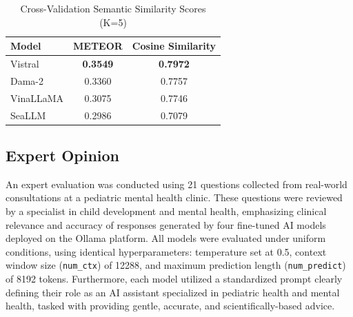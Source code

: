 \documentclass[runningheads]{llncs}
\begin{document}
\begin{table}[H]
\centering
\caption{Cross-Validation Semantic Similarity Scores (K=5)}
\label{tab:cv-semantic}
\begin{tabular}{|l|c|c|}
\hline
\textbf{Model} & \textbf{METEOR} & \textbf{Cosine Similarity} \\
\hline
Vistral    & \textbf{0.3549} & \textbf{0.7972} \\
Dama-2     & 0.3360 & 0.7757 \\
VinaLLaMA  & 0.3075 & 0.7746 \\
SeaLLM     & 0.2986 & 0.7079 \\
\hline
\end{tabular}
\end{table}

\subsection{Expert Opinion}

An expert evaluation was conducted using 21 questions collected from real-world consultations at a pediatric mental health clinic. These questions were reviewed by a specialist in child development and mental health, emphasizing clinical relevance and accuracy of responses generated by four fine-tuned AI models deployed on the Ollama platform. All models were evaluated under uniform conditions, using identical hyperparameters: temperature set at 0.5, context window size (\texttt{num\_ctx}) of 12288, and maximum prediction length (\texttt{num\_predict}) of 8192 tokens. Furthermore, each model utilized a standardized prompt clearly defining their role as an AI assistant specialized in pediatric health and mental health, tasked with providing gentle, accurate, and scientifically-based advice.
\end{document}
